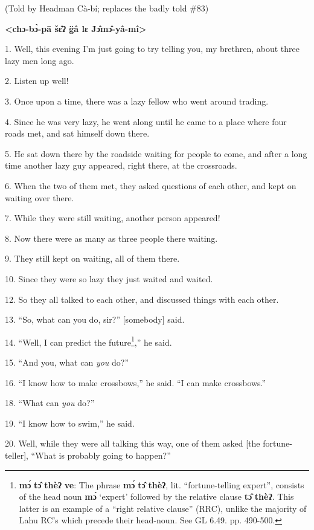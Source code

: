 \setcounter{footnote}{0}

(Told by Headman Cà-bí; replaces the badly told \#83)

\textbf{<chɔ-bɔ̀-pā šɛ̂ʔ g̈â lɛ Jɔ̂mɔ̂-yâ-mî>}

1. Well, this evening I'm just going to try telling you, my brethren, about three
lazy men long ago.

2. Listen up well!

3. Once upon a time, there was a lazy fellow who went around trading.

4. Since he was very lazy, he went along until he came to a place where four roads
met, and sat himself down there.

5. He sat down there by the roadside waiting for people to come, and after a long
time another lazy guy appeared, right there, at the crossroads.

6. When the two of them met, they asked questions of each other, and kept on waiting
over there.

7. While they were still waiting, another person appeared!

8. Now there were as many as three people there waiting.

9. They still kept on waiting, all of them there.

10. Since they were so lazy they just waited and waited.

12. So they all talked to each other, and discussed things with each other.

13. ``So, what can you do, sir?'' [somebody] said.

14. ``Well, I can predict the future\footnote{\textbf{mɔ́} \textbf{tɔ̂} \textbf{thèʔ} \textbf{ve}: The phrase \textbf{mɔ́} \textbf{tɔ̂} \textbf{thèʔ}, lit. ``fortune-telling expert'', consists of the head noun \textbf{mɔ́} `expert' followed by the relative clause \textbf{tɔ̂} \textbf{thèʔ}. This latter is an example of a ``right relative clause'' (RRC), unlike the majority of Lahu RC's which precede their head-noun. See GL 6.49. pp. 490-500.},'' he said.

15. ``And you, what can \textit{you} do?''

16. ``I know how to make crossbows,'' he said. ``I can make crossbows.''

18. ``What can \textit{you} do?''

19. ``I know how to swim,'' he said.

20. Well, while they were all talking this way, one of them asked [the fortune-teller],
``What is probably going to happen?''

